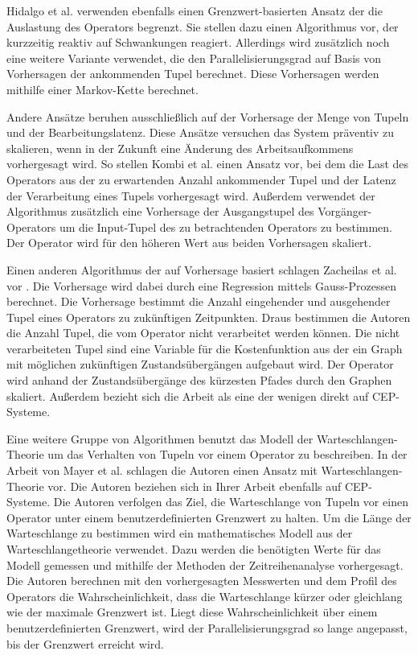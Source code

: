 Hidalgo et al. verwenden ebenfalls einen Grenzwert-basierten Ansatz der die Auslastung des Operators begrenzt.
Sie stellen dazu einen Algorithmus vor, der kurzzeitig reaktiv auf Schwankungen reagiert.
Allerdings wird zusätzlich noch eine weitere Variante verwendet, die den Parallelisierungsgrad auf Basis von Vorhersagen der ankommenden Tupel berechnet.
Diese Vorhersagen werden mithilfe einer Markov-Kette berechnet.

Andere Ansätze beruhen ausschließlich auf der Vorhersage der Menge von Tupeln und der Bearbeitungslatenz.
Diese Ansätze versuchen das System präventiv zu skalieren, wenn in der Zukunft eine Änderung des Arbeitsaufkommens vorhergesagt wird.
So stellen Kombi et al. \cite{kombi_preventive_2017} einen Ansatz vor, bei dem die Last des Operators aus der zu erwartenden Anzahl ankommender Tupel und der Latenz der Verarbeitung eines Tupels vorhergesagt wird.
Außerdem verwendet der Algorithmus zusätzlich eine Vorhersage der Ausgangstupel des Vorgänger-Operators um die Input-Tupel des zu betrachtenden Operators zu bestimmen.
Der Operator wird für den höheren Wert aus beiden Vorhersagen skaliert.

Einen anderen Algorithmus der auf Vorhersage basiert schlagen Zacheilas et al. vor \cite{zacheilas_elastic_2015}.
Die Vorhersage wird dabei durch eine Regression mittels Gauss-Prozessen berechnet.
Die Vorhersage bestimmt die Anzahl eingehender und ausgehender Tupel eines Operators zu zukünftigen Zeitpunkten.
Draus bestimmen die Autoren die Anzahl Tupel, die vom Operator nicht verarbeitet werden können.
Die nicht verarbeiteten Tupel sind eine Variable für die Kostenfunktion aus der ein Graph mit möglichen zukünftigen Zustandsübergängen aufgebaut wird.
Der Operator wird anhand der Zustandsübergänge des kürzesten Pfades durch den Graphen skaliert.
Außerdem bezieht sich die Arbeit als eine der wenigen direkt auf CEP-Systeme.

Eine weitere Gruppe von Algorithmen benutzt das Modell der Warteschlangen-Theorie um das Verhalten von Tupeln vor einem Operator zu beschreiben.
In der Arbeit von Mayer et al. \cite{mayer_predictable_2015} schlagen die Autoren einen Ansatz mit Warteschlangen-Theorie vor.
Die Autoren beziehen sich in Ihrer Arbeit ebenfalls auf CEP-Systeme.
Die Autoren verfolgen das Ziel, die Warteschlange von Tupeln vor einen Operator unter einem benutzerdefinierten Grenzwert zu halten.
Um die Länge der Warteschlange zu bestimmen wird ein mathematisches Modell aus der Warteschlangetheorie verwendet.
Dazu werden die benötigten Werte für das Modell gemessen und mithilfe der Methoden der Zeitreihenanalyse vorhergesagt.
Die Autoren berechnen mit den vorhergesagten Messwerten und dem Profil des Operators die Wahrscheinlichkeit, dass die Warteschlange kürzer oder gleichlang wie der maximale Grenzwert ist.
Liegt diese Wahrscheinlichkeit über einem benutzerdefinierten Grenzwert, wird der Parallelisierungsgrad so lange angepasst, bis der Grenzwert erreicht wird.

